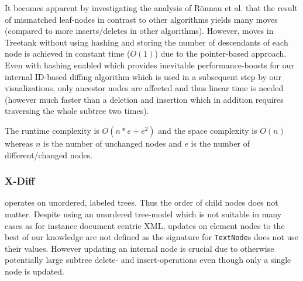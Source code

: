 It becomes apparent by investigating the analysis of Rönnau et al.\cite{ronnau2009efficient} that the result of mismatched leaf-nodes in contrast to other algorithms yields many moves (compared to more inserts/deletes in other algorithms). However, moves in Treetank without using hashing and storing the number of descendants of each node is achieved in constant time ($O(1)$) due to the pointer-based approach. Even with hashing enabled which provides inevitable performance-boosts for our internal ID-based diffing algorithm which is used in a subsequent step by our visualizations, only ancestor nodes are affected and thus linear time is needed (however much faster than a deletion and insertion which in addition requires traversing the whole subtree two times).

The runtime complexity is $O(n*e+e^2)$ and the space complexity is $O(n)$ whereas $n$ is the number of unchanged nodes and $e$ is the number of different/changed nodes.

\subsubsection{X-Diff\cite{wang2003x}}
operates on unordered, labeled trees. Thus the order of child nodes does not matter. Despite using an unordered tree-model which is not suitable in many cases as for instance document centric XML, updates on element nodes to the best of our knowledge are not defined as the signature for \texttt{TextNode}s does not use their values. However updating an internal node is crucial due to otherwise potentially large subtree delete- and insert-operations even though only a single node is updated.




